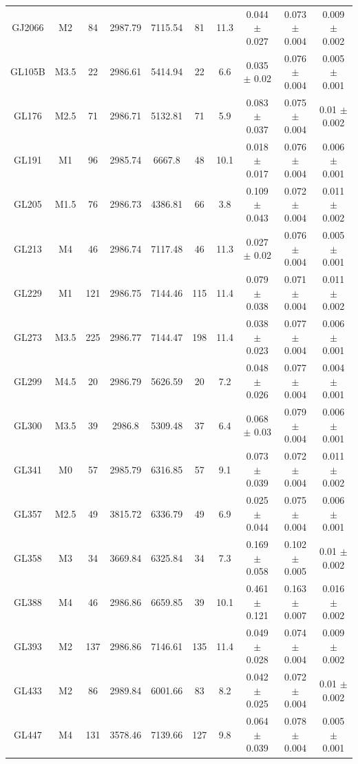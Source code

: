 \begin{landscape}
\begin{longtable}{|c|c|c|c|c|c|c|c|c|c|}
GJ2066 & M2 & 84 & 2987.79 & 7115.54 & 81 & 11.3 & 0.044 $\pm$ 0.027 & 0.073 $\pm$ 0.004 & 0.009 $\pm$ 0.002\\    
GL105B & M3.5 & 22 & 2986.61 & 5414.94 & 22 & 6.6 & 0.035 $\pm$ 0.02 & 0.076 $\pm$ 0.004 & 0.005 $\pm$ 0.001\\    
GL176 & M2.5 & 71 & 2986.71 & 5132.81 & 71 & 5.9 & 0.083 $\pm$ 0.037 & 0.075 $\pm$ 0.004 & 0.01 $\pm$ 0.002\\     
GL191 & M1 & 96 & 2985.74 & 6667.8 & 48 & 10.1 & 0.018 $\pm$ 0.017 & 0.076 $\pm$ 0.004 & 0.006 $\pm$ 0.001\\      
GL205 & M1.5 & 76 & 2986.73 & 4386.81 & 66 & 3.8 & 0.109 $\pm$ 0.043 & 0.072 $\pm$ 0.004 & 0.011 $\pm$ 0.002\\    
GL213 & M4 & 46 & 2986.74 & 7117.48 & 46 & 11.3 & 0.027 $\pm$ 0.02 & 0.076 $\pm$ 0.004 & 0.005 $\pm$ 0.001\\      
GL229 & M1 & 121 & 2986.75 & 7144.46 & 115 & 11.4 & 0.079 $\pm$ 0.038 & 0.071 $\pm$ 0.004 & 0.011 $\pm$ 0.002\\   
GL273 & M3.5 & 225 & 2986.77 & 7144.47 & 198 & 11.4 & 0.038 $\pm$ 0.023 & 0.077 $\pm$ 0.004 & 0.006 $\pm$ 0.001\\ 
GL299 & M4.5 & 20 & 2986.79 & 5626.59 & 20 & 7.2 & 0.048 $\pm$ 0.026 & 0.077 $\pm$ 0.004 & 0.004 $\pm$ 0.001\\    
GL300 & M3.5 & 39 & 2986.8 & 5309.48 & 37 & 6.4 & 0.068 $\pm$ 0.03 & 0.079 $\pm$ 0.004 & 0.006 $\pm$ 0.001\\      
GL341 & M0 & 57 & 2985.79 & 6316.85 & 57 & 9.1 & 0.073 $\pm$ 0.039 & 0.072 $\pm$ 0.004 & 0.011 $\pm$ 0.002\\      
GL357 & M2.5 & 49 & 3815.72 & 6336.79 & 49 & 6.9 & 0.025 $\pm$ 0.044 & 0.075 $\pm$ 0.004 & 0.006 $\pm$ 0.001\\    
GL358 & M3 & 34 & 3669.84 & 6325.84 & 34 & 7.3 & 0.169 $\pm$ 0.058 & 0.102 $\pm$ 0.005 & 0.01 $\pm$ 0.002\\       
GL388 & M4 & 46 & 2986.86 & 6659.85 & 39 & 10.1 & 0.461 $\pm$ 0.121 & 0.163 $\pm$ 0.007 & 0.016 $\pm$ 0.002\\     
GL393 & M2 & 137 & 2986.86 & 7146.61 & 135 & 11.4 & 0.049 $\pm$ 0.028 & 0.074 $\pm$ 0.004 & 0.009 $\pm$ 0.002\\   
GL433 & M2 & 86 & 2989.84 & 6001.66 & 83 & 8.2 & 0.042 $\pm$ 0.025 & 0.072 $\pm$ 0.004 & 0.01 $\pm$ 0.002\\       
GL447 & M4 & 131 & 3578.46 & 7139.66 & 127 & 9.8 & 0.064 $\pm$ 0.039 & 0.078 $\pm$ 0.004 & 0.005 $\pm$ 0.001\\    

\end{longtable}
\end{landscape}
